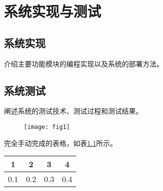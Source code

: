 

\chapter{系统实现与测试}

\section{系统实现}
介绍主要功能模块的编程实现以及系统的部署方法。

\section{系统测试}
阐述系统的测试技术、测试过程和测试结果。
\begin{figure}[H]
	\centering 
	\texttt{[image: fig1]} 
	\label{fig:single3}
\end{figure}
完全手动完成的表格，如表\ref{tab:tab1}所示。
\begin{table}[h] %
	\centering  %
	\label{tab:tab1}  %
	\begin{tabular}{|c|c|c|c|}   
		\hline  %
		1 & 2 & 3 & 4 \\  %
		\hline 
		0.1 & 0.2 & 0.3 & 0.4 \\
		\hline
	\end{tabular}
\end{table}
